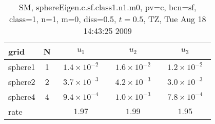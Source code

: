 \begin{table}[hbt]\tableFont %
\begin{center}
\begin{tabular}{|l|c|c|c|c|} \hline 
grid  & N &  $u_1$ & $u_2$ & $u_3$  \\ \hline 
             sphere1 &     1 & ~$1.4\times10^{ -2}$~ & ~$1.6\times10^{ -2}$~ & ~$1.2\times10^{ -2}$~  \\ \hline
             sphere2 &     2 & ~$3.7\times10^{ -3}$~ & ~$4.2\times10^{ -3}$~ & ~$3.0\times10^{ -3}$~  \\ \hline
             sphere4 &     4 & ~$9.4\times10^{ -4}$~ & ~$1.0\times10^{ -3}$~ & ~$7.8\times10^{ -4}$~  \\ \hline
    rate             &       &       $1.97$          &       $1.99$          &       $1.95$           \\ \hline
\end{tabular}
\caption{SM, sphereEigen.c.sf.class1.n1.m0, pv=c, bcn=sf, class=1, n=1, m=0, diss=0.5, $t=0.5$,  TZ, Tue Aug 18 14:43:25 2009}\label{table:sphereEigen.c.sf.class1.n1.m0}
\end{center}
\end{table}
